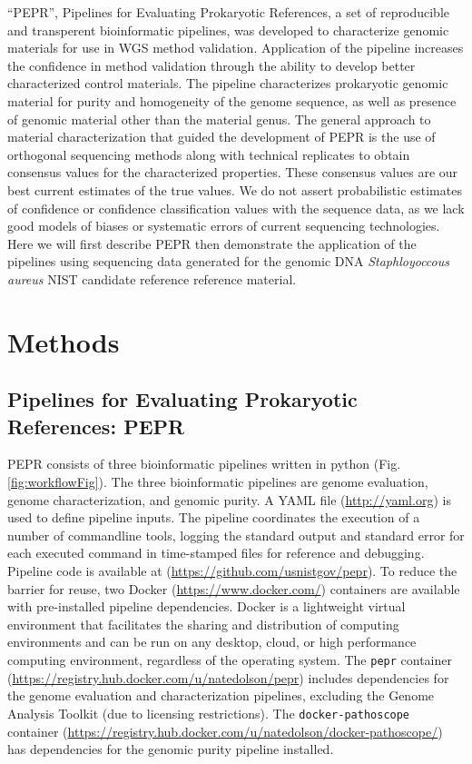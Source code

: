 \documentclass[smallextended]{svjour3}\usepackage[]{graphicx}\usepackage[]{color}
\begin{document}
“PEPR”, Pipelines for Evaluating Prokaryotic References, a set of reproducible and transperent bioinformatic pipelines, was developed to characterize genomic materials for use in WGS method validation. Application of the pipeline increases the confidence in method validation through the ability to develop better characterized control materials. The pipeline characterizes prokaryotic genomic material for purity and homogeneity of the genome sequence, as well as presence of genomic material other than the material genus. The general approach to material characterization that guided the development of PEPR is the use of orthogonal sequencing methods along with technical replicates to obtain consensus values for the characterized properties. These consensus values are our best current estimates of the true values. We do not assert probabilistic estimates of confidence or confidence classification values with the sequence data, as we lack good models of biases or systematic errors of current sequencing technologies. Here we will first describe PEPR then demonstrate the application of the pipelines using sequencing data generated for the genomic DNA \textit{Staphloyoccous aureus} NIST candidate reference reference material.

\section{Methods}
\label{methods}
\subsection{Pipelines for Evaluating Prokaryotic References: PEPR}
\label{method:1}
PEPR consists of three bioinformatic pipelines written in python (Fig. \ref{fig:workflowFig}).  The three bioinformatic pipelines are genome evaluation, genome characterization, and genomic purity. A YAML file (\url{http://yaml.org}) is used to define pipeline inputs. The pipeline coordinates the execution of a number of commandline tools, logging the standard output and standard error for each executed command in time-stamped files for reference and debugging. Pipeline code is available at (\url{https://github.com/usnistgov/pepr}). To reduce the barrier for reuse, two Docker (\url{https://www.docker.com/}) containers are available with pre-installed pipeline dependencies. Docker is a lightweight virtual environment that facilitates the sharing and distribution of computing environments and can be run on any desktop, cloud, or high performance computing environment, regardless of the operating system. The \texttt{pepr} container (\url{https://registry.hub.docker.com/u/natedolson/pepr}) includes dependencies for the genome evaluation and characterization pipelines, excluding the Genome Analysis Toolkit (due to licensing restrictions). The \texttt{docker-pathoscope} container (\url{https://registry.hub.docker.com/u/natedolson/docker-pathoscope/}) has dependencies for the genomic purity pipeline installed.
\end{document}
